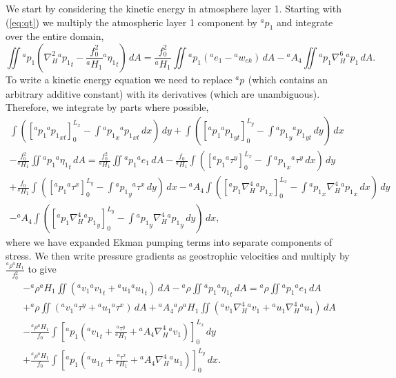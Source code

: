 \documentclass[11pt, a4paper,twoside]{article}
\newcommand{\etb}[2]{{{}^{#1}\eta_{#2}}}
\newcommand{\rhb}[1]{{{}^{#1}\rho}}
\newcommand{\p}[2]{{{}^{#1}p_{#2}}}
\newcommand{\uu}[2]{{{}^{#1}u_{#2}}}
\newcommand{\vv}[2]{{{}^{#1}v_{#2}}}
\newcommand{\ek}[1]{{{}^{#1}w_{ek}}}
\newcommand{\HH}[2]{{{}^{#1}H_{#2}}}
\newcommand{\ah}[1]{{{}^{#1}A_4}}
\newcommand{\e}[2]{{{}^{#1}e_{#2}}}
\newcommand{\tx}[2]{{}^{#1}\tau^{#2}}
\numberwithin{equation}{section}
\begin{document}
We start by considering the kinetic energy in atmosphere layer 1.
Starting with (\ref{eq:qt}) we multiply the atmospheric layer 1 component by $\p{a}{1}$ and integrate over the entire domain,
\begin{equation}
\iint \p{a}{1}\left(\nabla_H^2\p{a}{1}_t - \frac{f_0^2}{\HH{a}{1}}\etb{a}{1}_t \right)\, dA =  \frac{f_0^2}{\HH{a}{1}}\iint \p{a}{1}(\e{a}{1} - \ek{a}) \, dA - \ah{a} \iint \p{a}{1}\nabla_H^6 \p{a}{1} \,dA.
\end{equation}
To write a kinetic energy equation we need to replace $\p{a}{}$ (which contains an arbitrary additive constant) with its derivatives (which are unambiguous).
Therefore, we integrate by parts where possible,
\begin{multline}
\int \left( [\p{a}{1} \p{a}{1}_{xt}]_0^{L_x} - \int \p{a}{1}_x \p{a}{1}_{xt} \, dx \right) \, dy + \int \left([\p{a}{1}\p{a}{1}_{yt}]_0^{L_y} - \int \p{a}{1}_y\p{a}{1}_{yt} \, dy \right)\, dx \\
- \frac{f_0^2}{\HH{a}{1}}\iint\p{a}{1}\etb{a}{1}_t \, dA =  \frac{f_0^2}{\HH{a}{1}}\iint\p{a}{1}\e{a}{1} \, dA - \frac{f_0}{\HH{a}{1}} \int \left( [\p{a}{1}\tx{a}{y}]_0^{L_x} - \int\p{a}{1}_x\tx{a}{y} \, dx\right) \, dy \\
+ \frac{f_0}{\HH{a}{1}} \int \left( [\p{a}{1}\tx{a}{x}]_0^{L_y} - \int\p{a}{1}_y\tx{a}{x}\, dy\right) \, dx - \ah{a} \int \left( [\p{a}{1}\nabla_H^4 \p{a}{1}_{x}]_0^{L_x} - \int \p{a}{1}_x \nabla_H^4 \p{a}{1}_{x} \, dx \right)\,dy\\
-\ah{a} \int \left( [\p{a}{1} \nabla_H^4 \p{a}{1}_{y}]_0^{L_y} - \int \p{a}{1}_y \nabla_H^4 \p{a}{1}_{y} \,dy \right) \, dx,
\end{multline}
where we have expanded Ekman pumping terms into separate components of stress.
We then write pressure gradients as geostrophic velocities and multiply by $\tfrac{\rhb{a}\HH{a}{1}}{f_0^2}$ to give
\begin{multline}
 -\rhb{a}\HH{a}{1} \iint \left(\vv{a}{1} \vv{a}{1}_{t} + \uu{a}{1}\uu{a}{1}_{t} \right)\, dA - \rhb{a}\iint\p{a}{1}\etb{a}{1}_t \, dA = \rhb{a}\iint\p{a}{1} \e{a}{1} \, dA \\
+ \rhb{a} \iint \left( \vv{a}{1}\tx{a}{y} + \uu{a}{1}\tx{a}{x}\right) \, dA + \ah{a}\rhb{a}\HH{a}{1}  \iint \left( \vv{a}{1} \nabla_H^4 \vv{a}{1} + \uu{a}{1} \nabla_H^4 \uu{a}{1} \right) \,dA \\
- \frac{\rhb{a}\HH{a}{1}}{f_0}\int \left[\p{a}{1}\left( \vv{a}{1}_t + \frac{\tx{a}{y}}{\HH{a}{1}}  + \ah{a}\nabla_H^4 \vv{a}{1}\right)\right]_0^{L_x} \,dy \\
+ \frac{\rhb{a}\HH{a}{1}}{f_0} \int \left[\p{a}{1} \left(\uu{a}{1}_t + \frac{\tx{a}{x}}{\HH{a}{1}}  + \ah{a}\nabla_H^4 \uu{a}{1}\right)\right]_0^{L_y} \,dx.
\end{multline}
\end{document}
